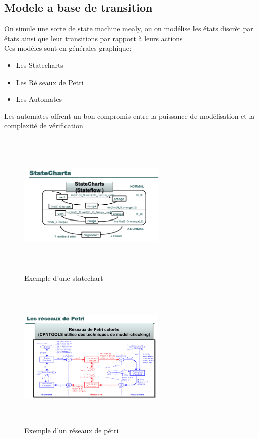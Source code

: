 \documentclass[oneside]{book}
\begin{document}
    \subsection{Modele a base de transition}
    On simule une sorte de state machine mealy, ou on modélise les états discrèt par états ainsi que leur transitions par rapport à leurs actions\\
    
    Ces modèles sont en générales graphique:
    \begin{itemize}
        \item Les Statecharts
        \item Les Ré seaux de Petri
        \item Les Automates
    \end{itemize}

    Les automates offrent un bon compromis entre la puissance de modélisation et la complexité de vérification\\
    
    \begin{figure}[!ht]
    	\centering
    	\includegraphics[width = 7cm, height = 7cm, keepaspectratio]{Images/statechart.png}
    	\caption{Exemple d'une statechart}
    	\label{fig:StateChart}
    \end{figure}
	
	\begin{figure}[!ht]
		\centering
		\includegraphics[width = 7cm, height = 7cm, keepaspectratio]{Images/reseaux_petri.png}
		\caption{Exemple d'un réseaux de pétri}
		\label{fig:PetriNetwork}
	\end{figure}
\end{document}
